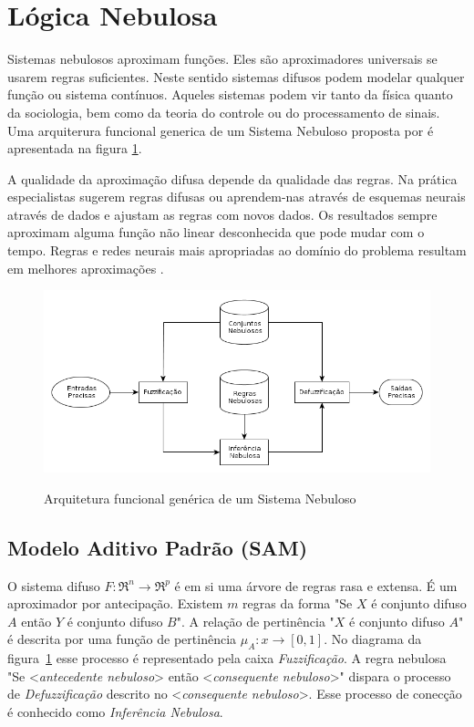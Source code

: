 \section{Lógica Nebulosa}

Sistemas nebulosos aproximam funções. Eles são aproximadores universais se usarem regras suficientes. 
Neste sentido sistemas difusos podem modelar qualquer função ou sistema contínuos. Aqueles sistemas 
podem vir tanto da física quanto da sociologia, bem como da teoria do controle ou do 
processamento de sinais. Uma arquiterura funcional generica de um Sistema Nebuloso proposta por
\cite{passos2005datamining} é apresentada na figura \ref{arq_fuzzy}.

A qualidade da aproximação difusa depende da qualidade das regras. Na prática especialistas sugerem regras
difusas ou aprendem-nas através de esquemas neurais através de dados e ajustam as regras com novos dados.
Os resultados sempre aproximam alguma função não linear desconhecida que pode mudar com o tempo. Regras e redes neurais mais apropriadas ao domínio do problema resultam em melhores aproximações \cite{kosko1997fuzzy}.

\begin{figure}
  \includegraphics[width=15cm]{imgs/arquitetura_fuzzy}\label{arq_fuzzy}
  \caption{Arquitetura funcional genérica de um Sistema Nebuloso \cite{passos2005datamining}}
\end{figure}

\subsection{Modelo Aditivo Padrão (SAM)}

O sistema difuso $F:\Re^n \rightarrow \Re^p$ é em si uma árvore de regras rasa e extensa. É um aproximador
por antecipação. Existem $m$ regras da forma "Se $X$ é conjunto difuso $A$ então $Y$ é conjunto difuso $B$".
A relação de pertinência "$X$ é conjunto difuso $A$" é descrita por uma função de pertinência
$\mu_A: x \longrightarrow [0,1]$. No diagrama da figura~\ref{arq_fuzzy} esse processo é representado pela
caixa \emph{Fuzzificação}. A regra nebulosa "Se <\textit{antecedente nebuloso}> então <\textit{consequente nebuloso}>" dispara
o processo de \emph{Defuzzificação} descrito no <\textit{consequente nebuloso}>. Esse processo de conecção é conhecido como
\emph{Inferência Nebulosa}.

